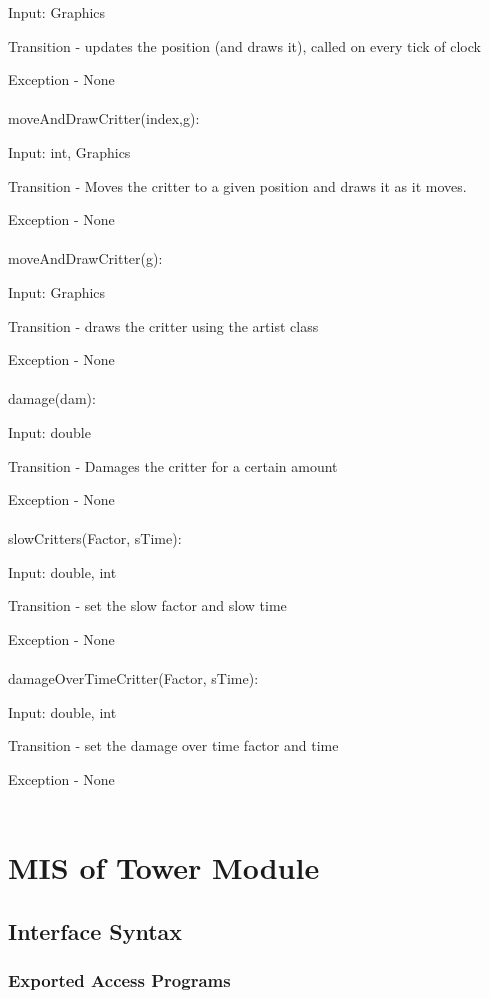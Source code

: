 \documentclass[12,english]{article}
\begin{document}
		    Input: Graphics
		    
		    Transition - updates the position (and draws it), called on every tick of clock
		    
		    Exception - None\\ 
			 \\
		moveAndDrawCritter(index,g):
		    
		    Input: int, Graphics
		    
		    Transition - Moves the critter to a given position and draws it as it moves.
		    
		    Exception - None\\ 
			 \\
	    moveAndDrawCritter(g):
		    
		   Input: Graphics
		    
		   Transition - draws the critter using the artist class
		    
		   Exception - None\\ 
			 \\
	    damage(dam):
		    
		   Input: double
		    
		   Transition - Damages the critter for a certain amount
		    
		   Exception - None\\ 
			 \\
		slowCritters(Factor, sTime):
		    
		   Input: double, int
		    
		   Transition - set the slow factor and slow time
		    
		   Exception - None\\ 
			 \\
	    damageOverTimeCritter(Factor, sTime):
		    
		   Input: double, int
		    
		   Transition - set the damage over time factor and time
		    
		   Exception - None\\ 
			 \\
        

\section{MIS of Tower Module}
	\subsection{Interface Syntax}
		\subsubsection{Exported Access Programs}
		
\end{document}
